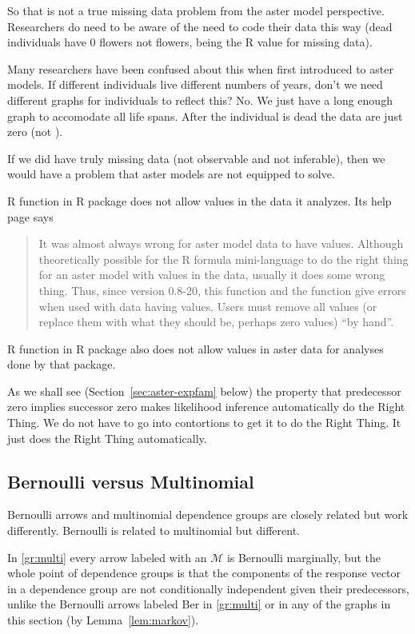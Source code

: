 So that is not a true missing data problem from the aster model perspective.
Researchers do need to be aware of the need to code their data this way
(dead individuals have 0 flowers not  flowers,  being
the R value for missing data).

Many researchers have been confused about this when first introduced to
aster models.  If different individuals live different numbers of years,
don't we need different graphs for individuals to reflect this?  No.
We just have a long enough graph to accomodate all life spans.  After
the individual is dead the data are just zero (not ).

If we did have truly missing data (not observable and not inferable),
then we would have a problem that aster models are not equipped to solve.

R function  in R package  does not allow 
values in the data it analyzes.  Its help page says
\begin{quotation}
     It was almost always wrong for aster model data to have 
     values. Although theoretically possible for the R formula
     mini-language to do the right thing for an aster model with 
     values in the data, usually it does some wrong thing.  Thus, since
     version 0.8-20, this function and the  function give
     errors when used with data having  values.  Users must remove
     all  values (or replace them with what they should be, perhaps
     zero values) ``by hand''.
\end{quotation}
R function  in R package  also does not
allow  values in aster data for analyses done by that package.

As we shall see (Section~\ref{sec:aster-expfam} below)
the property that predecessor zero implies successor zero
makes likelihood inference automatically do the Right Thing.
We do not have to go into contortions to get it to do the Right Thing.
It just does the Right Thing automatically.

\subsection{Bernoulli versus Multinomial}

Bernoulli arrows and multinomial dependence groups are closely related but
work differently.  Bernoulli is related to multinomial but different.

In \eqref{gr:multi} every arrow labeled with an $\mathcal{M}$ is Bernoulli
marginally, but the whole point of dependence groups is that the components
of the response vector in a dependence group are not
conditionally independent given their predecessors, unlike the Bernoulli
arrows labeled Ber in \eqref{gr:multi} or in any of the graphs in this
section (by Lemma~\ref{lem:markov}).


